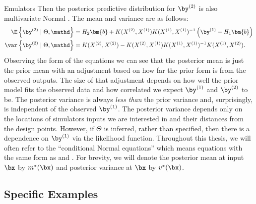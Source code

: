 \begin{chapter}{Emulators \label{Ch:Emulators}}
Then the posterior predictive distribution for $\by^{(2)}$ is also multivariate Normal \citep{Rasmussen2006Gpfm}. The mean and variance are as follows:
\begin{align}
  \E \left\{ \by^{(2)} \mid \Theta, \mathd \right\} &= H_2 \bm{b} + K(X^{(2)}, X^{(1)})K(X^{(1)}, X^{(1)})^{-1} \left( \by^{(1)} - H_1 \bm{b} \right) \label{Eq:MV1}\\
  \var \left\{\by^{(2)} \mid \Theta, \mathd \right\} &= K(X^{(2)}, X^{(2)})- K(X^{(2)}, X^{(1)})K(X^{(1)}, X^{(1)})^{-1}K(X^{(1)}, X^{(2)}).\label{Eq:MV2}
\end{align}
Observing the form of the equations we can see that the posterior mean is just the prior mean with an adjustment based on how far the prior form is from the observed outputs. The size of that adjustment depends on how well the prior model fits the observed data and how correlated we expect $\by^{(1)}$ and $\by^{(2)}$ to be. The posterior variance is always \textit{less than} the prior variance and, surprisingly, is independent of the observed $\by^{(1)}$.  The posterior variance depends only on the locations of simulators inputs we are interested in and their distances from the design points. However, if $\Theta$ is inferred, rather than specified, then there is a dependence on $\by^{(1)}$ via the likelihood function. Throughout this thesis, we will often refer to the ``conditional Normal equations'' which means equations with the same form as  and . For brevity, we will denote the posterior mean at input $\bx$ by $m^{*}(\bx)$ and posterior variance at $\bx$ by $v^{*}(\bx)$.

\subsection{Specific Examples}


\end{chapter}
